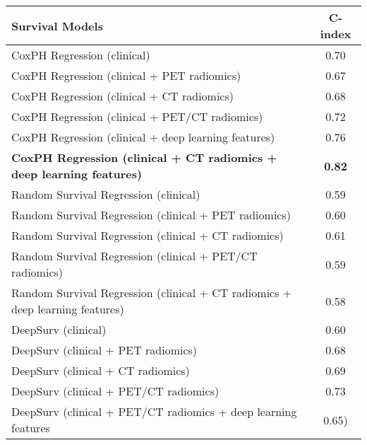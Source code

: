 {\small 

\begin{tabular}{l c}
    
\hline 
    Survival Models   & C-index \\ [0.5ex] 
    \hline\hline 
    CoxPH Regression (clinical) & 0.70 \\
    CoxPH Regression (clinical + PET radiomics) & 0.67 \\
    CoxPH Regression (clinical + CT radiomics)  & 0.68 \\
    CoxPH Regression (clinical + PET/CT radiomics) & 0.72 \\
    CoxPH Regression (clinical + deep learning features) & 0.76 \\
    \textbf{CoxPH Regression (clinical + CT radiomics + deep learning features)} & \textbf{0.82} \\
    Random Survival Regression (clinical) & 0.59 \\
    Random Survival Regression (clinical + PET radiomics) & 0.60 \\
    Random Survival Regression (clinical + CT radiomics) & 0.61 \\
    Random Survival Regression (clinical + PET/CT radiomics) & 0.59 \\
    Random Survival Regression (clinical + CT radiomics + deep learning features) & 0.58 \\
    DeepSurv (clinical) & 0.60 \\
    DeepSurv (clinical + PET radiomics) & 0.68 \\
    DeepSurv (clinical + CT radiomics) & 0.69 \\
    DeepSurv (clinical + PET/CT radiomics) & 0.73 \\
    DeepSurv (clinical + PET/CT radiomics + deep learning features & 0.65) \\ [1ex]
    \hline 
\end{tabular}

}
